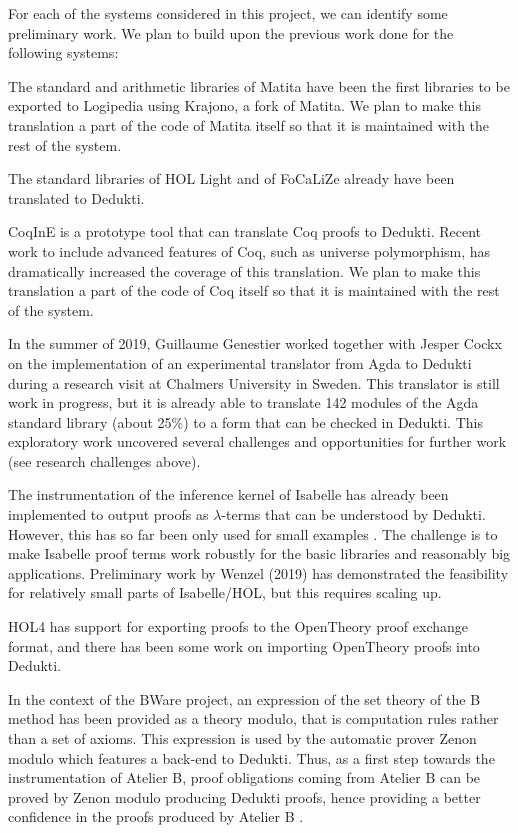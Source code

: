 For each of the systems considered in this project, we can identify
some preliminary work.  We plan to build upon the previous work done
for the following systems:

\begin{compactitem}
\item The standard and arithmetic libraries of Matita have been the
  first libraries to be exported to Logipedia using Krajono, a fork of
  Matita. We plan to make this translation a part of the code of
  Matita itself so that it is maintained with the rest of the system.

\item The standard libraries of HOL Light and of FoCaLiZe already have been
  translated to Dedukti.

\item CoqInE is a prototype tool that can translate Coq proofs to
  Dedukti. Recent work to include advanced features of Coq, such as
  universe polymorphism, has dramatically increased the coverage of
  this translation. We plan to make this translation a part of the
  code of Coq itself so that it is maintained with the rest of the
  system.

\item In the summer of 2019, Guillaume Genestier worked together with
  Jesper Cockx on the implementation of an experimental translator
  from Agda to Dedukti during a research visit at Chalmers University
  in Sweden. This translator is still work in progress, but it is
  already able to translate 142 modules of the Agda standard library
  (about 25\%) to a form that can be checked in Dedukti. This
  exploratory work uncovered several challenges and opportunities for
  further work (see research challenges above).

\item The instrumentation of the inference kernel of Isabelle has already
  been implemented 
  to output proofs as $\lambda$-terms that can be understood by
  Dedukti. However, this has so far been only used for small examples
  \cite{Berghofer-Nipkow:2000:TPHOL}. The challenge is to make
  Isabelle proof terms work robustly for the basic libraries and
  reasonably big applications.  Preliminary work by Wenzel (2019) has
  demonstrated the feasibility for relatively small parts of
  Isabelle/HOL, but this requires scaling up.

\item HOL4 has support for exporting proofs to the OpenTheory proof
  exchange format, and there has been some work on importing
  OpenTheory proofs into Dedukti.

\item In the context of the BWare project, an expression of the set
  theory of the B method has been provided as a theory modulo, that is
  computation rules rather than a set of axioms. This expression is used
  by the automatic prover Zenon modulo which features a back-end to
  Dedukti. Thus, as a first step towards the instrumentation of Atelier B,
  proof obligations coming from Atelier B can be proved by Zenon
  modulo producing Dedukti proofs, hence providing a better confidence
  in the proofs produced by Atelier B \cite{Bury18}.
\end{compactitem}

